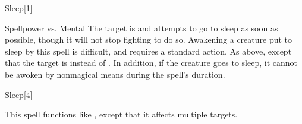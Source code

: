 \begin{spellsection}{Sleep}[1]
    \begin{spellheader}
    \end{spellheader}
    \begin{spellcontent}
        \begin{spelltargetinginfo}
        \end{spelltargetinginfo}
        \begin{spelleffects}
            \begin{spellattack}{Spellpower vs. Mental}
                \spellsuccess The target is \fatigued and attempts to go to sleep as soon as possible, though it will not stop fighting to do so. Awakening a creature put to sleep by this spell is difficult, and requires a standard action.
                \spellcritical As above, except that the target is \exhausted instead of \fatigued. In addition, if the creature goes to sleep, it cannot be awoken by nonmagical means during the spell's duration.
            \end{spellattack}
            \spelldur \durmed
        \end{spelleffects}
    \end{spellcontent}
    \begin{spellfooter}
        \miscastrandom
    \end{spellfooter}
\end{spellsection}

\begin{spellsection}[Mass]{Sleep}[4]
    \begin{spellheader}
    \end{spellheader}
    \begin{spellcontent}
        \begin{spelltargetinginfo}
        \end{spelltargetinginfo}
        \begin{spelleffects}
            \spellspecial This spell functions like , except that it affects multiple targets.
        \end{spelleffects}
    \end{spellcontent}
    \begin{spellfooter}
        \miscastexplode
    \end{spellfooter}
\end{spellsection}

